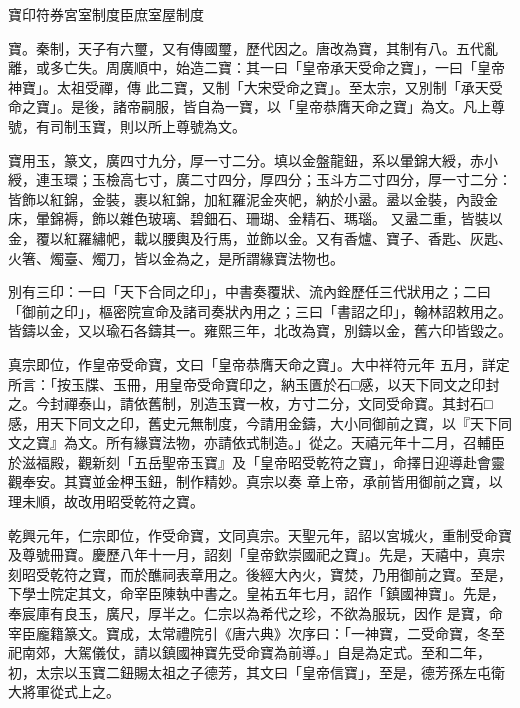 
\begin{pinyinscope}

 寶印符券宮室制度臣庶室屋制度



 寶。秦制，天子有六璽，又有傳國璽，歷代因之。唐改為寶，其制有八。五代亂離，或多亡失。周廣順中，始造二寶：其一曰「皇帝承天受命之寶」，一曰「皇帝神寶」。太祖受禪，傳
 此二寶，又制「大宋受命之寶」。至太宗，又別制「承天受命之寶」。是後，諸帝嗣服，皆自為一寶，以「皇帝恭膺天命之寶」為文。凡上尊號，有司制玉寶，則以所上尊號為文。



 寶用玉，篆文，廣四寸九分，厚一寸二分。填以金盤龍鈕，系以暈錦大綬，赤小綬，連玉環；玉檢高七寸，廣二寸四分，厚四分；玉斗方二寸四分，厚一寸二分：皆飾以紅錦，金裝，裹以紅錦，加紅羅泥金夾帊，納於小盝。盝以金裝，內設金床，暈錦褥，飾以雜色玻璃、碧鈿石、珊瑚、金精石、瑪瑙。
 又盝二重，皆裝以金，覆以紅羅繡帊，載以腰輿及行馬，並飾以金。又有香爐、寶子、香匙、灰匙、火箸、燭臺、燭刀，皆以金為之，是所謂緣寶法物也。



 別有三印：一曰「天下合同之印」，中書奏覆狀、流內銓歷任三代狀用之；二曰「御前之印」，樞密院宣命及諸司奏狀內用之；三曰「書詔之印」，翰林詔敕用之。皆鑄以金，又以瑜石各鑄其一。雍熙三年，北改為寶，別鑄以金，舊六印皆毀之。



 真宗即位，作皇帝受命寶，文曰「皇帝恭膺天命之寶」。大中祥符元年
 五月，詳定所言：「按玉牒、玉冊，用皇帝受命寶印之，納玉匱於石□感，以天下同文之印封之。今封禪泰山，請依舊制，別造玉寶一枚，方寸二分，文同受命寶。其封石□感，用天下同文之印，舊史元無制度，今請用金鑄，大小同御前之寶，以『天下同文之寶』為文。所有緣寶法物，亦請依式制造。」從之。天禧元年十二月，召輔臣於滋福殿，觀新刻「五岳聖帝玉寶』及「皇帝昭受乾符之寶」，命擇日迎導赴會靈觀奉安。其寶並金柙玉鈕，制作精妙。真宗以奏
 章上帝，承前皆用御前之寶，以理未順，故改用昭受乾符之寶。



 乾興元年，仁宗即位，作受命寶，文同真宗。天聖元年，詔以宮城火，重制受命寶及尊號冊寶。慶歷八年十一月，詔刻「皇帝欽崇國祀之寶」。先是，天禧中，真宗刻昭受乾符之寶，而於醮祠表章用之。後經大內火，寶焚，乃用御前之寶。至是，下學士院定其文，命宰臣陳執中書之。皇祐五年七月，詔作「鎮國神寶」。先是，奉宸庫有良玉，廣尺，厚半之。仁宗以為希代之珍，不欲為服玩，因作
 是寶，命宰臣龐籍篆文。寶成，太常禮院引《唐六典》次序曰：「一神寶，二受命寶，冬至祀南郊，大駕儀仗，請以鎮國神寶先受命寶為前導。」自是為定式。至和二年，初，太宗以玉寶二鈕賜太祖之子德芳，其文曰「皇帝信寶」，至是，德芳孫左屯衛大將軍從式上之。




\end{pinyinscope}
